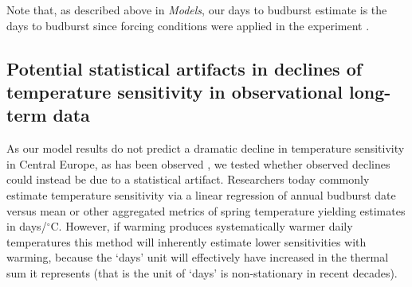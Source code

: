 \documentclass{article}
\begin{document}
\par Note that, as described above in \emph{Models}, our days to budburst estimate is the days to budburst since forcing conditions were applied in the experiment \citep[which we stress is not necessarily the days to budburst after the start of ecodormancy][]{chuine2016}.




 



\subsection*{Potential statistical artifacts in declines of temperature sensitivity in observational long-term data} %

As our model results do not predict a dramatic decline in temperature sensitivity in Central Europe, as has been observed \citep[e.g.,][]{fu2015}, we tested whether observed declines could instead be due to a statistical artifact. Researchers today commonly estimate temperature sensitivity via a linear regression of annual budburst date versus mean or other aggregated metrics of spring temperature yielding estimates in days/$^{\circ}$C. However, if warming produces systematically warmer daily temperatures this method will inherently estimate lower sensitivities with warming, because the `days' unit will effectively have increased in the thermal sum it represents (that is the unit of `days' is non-stationary in recent decades).
\end{document}
